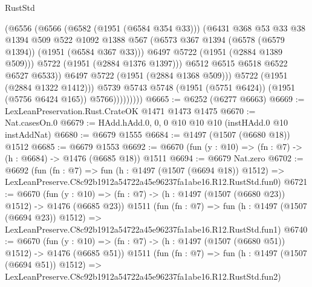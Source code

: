 \begin{lexlean}{RustStd}
\begin{coremodule}
                            (@6556
                              (@6566
                                (@6582 (@1951 (@6584 @354 @33)))
                                (@6431
                                  @368
                                  @53
                                  @33
                                  @38
                                  @1394
                                  @509
                                  @522
                                  @1092
                                  @1388
                                  @567
                                  (@6573 @367 @1394 (@6578 (@6579 @1394)) (@1951 (@6584 @367 @33)))
                                  @6497
                                  @5722
                                  (@1951 (@2884 @1389 @509)))
                                @5722
                                (@1951 (@2884 @1376 @1397)))
                              @6512
                              @6515
                              @6518
                              @6522
                              @6527
                              @6533))
                          @6497
                          @5722
                          (@1951 (@2884 @1368 @509)))
                        @5722
                        (@1951 (@2884 @1322 @1412)))
                      @5739
                      @5743
                      @5748
                      (@1951 (@5751 @6424))
                      (@1951 (@5756 @6424 @165))
                      @5766)))))))))
@6665 := @6252 (@6277 @6663)
@6669 := LexLeanPreservation.Rust.CrateOK @1471 @1473 @1475
@6670 := Nat.casesOn.{0}
@6679 := HAdd.hAdd.{0, 0, 0} @10 @10 @10 (instHAdd.{0} @10 instAddNat)
@6680 := @6679 @1555
@6684 := @1497 (@1507 (@6680 @18)) @1512
@6685 := @6679 @1553
@6692 := @6670 (fun (y : @10) => (fn : @7) -> (h : @6684) -> @1476 (@6685 @18)) @1511
@6694 := @6679 Nat.zero
@6702 := @6692
    (fun (fn : @7) =>
    fun (h : @1497 (@1507 (@6694 @18)) @1512) =>
    LexLeanPreserve.C8c92b1912a54722a45e96237fa1abe16.R12.RustStd.fun0)
@6721 := @6670
    (fun (y : @10) => (fn : @7) -> (h : @1497 (@1507 (@6680 @23)) @1512) -> @1476 (@6685 @23))
    @1511
    (fun (fn : @7) =>
    fun (h : @1497 (@1507 (@6694 @23)) @1512) =>
    LexLeanPreserve.C8c92b1912a54722a45e96237fa1abe16.R12.RustStd.fun1)
@6740 := @6670
    (fun (y : @10) => (fn : @7) -> (h : @1497 (@1507 (@6680 @51)) @1512) -> @1476 (@6685 @51))
    @1511
    (fun (fn : @7) =>
    fun (h : @1497 (@1507 (@6694 @51)) @1512) =>
    LexLeanPreserve.C8c92b1912a54722a45e96237fa1abe16.R12.RustStd.fun2)

\end{coremodule}
\end{lexlean}
